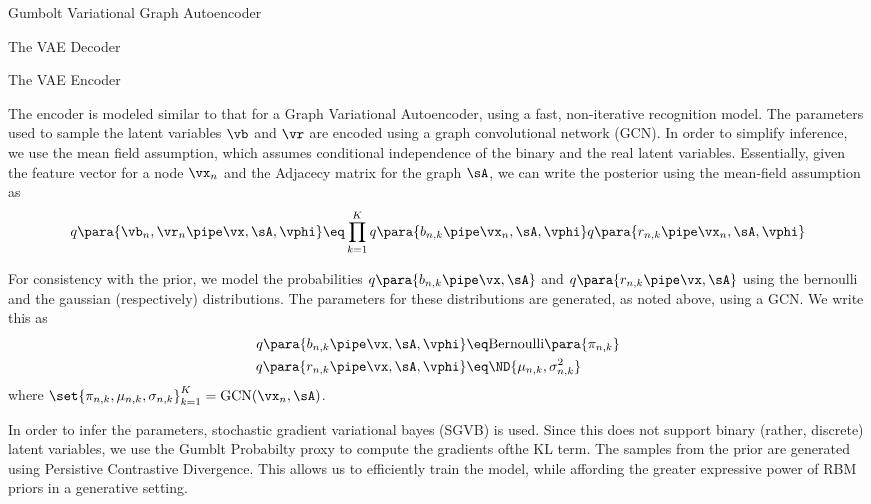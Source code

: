 \documentclass{article}
\newcommand{\qp}{q\para}
\begin{document}
\begin{psection}{Gumbolt Variational Graph Autoencoder}
\begin{psubsection}{The VAE Decoder}
	\end{psubsection}

	\begin{psubsection}{The VAE Encoder}

		The encoder is modeled similar to that for a Graph Variational Autoencoder, using a fast, non-iterative recognition model. The parameters used to sample the latent variables $\vb$ and $\vr$ are encoded using a graph convolutional network (GCN). In order to simplify inference, we use the mean field assumption, which assumes conditional independence of the binary and the real latent variables. Essentially, given the feature vector for a node $\vx_n$ and the Adjacecy matrix for the graph $\sA$, we can write the posterior using the mean-field assumption as
		\begin{align}
			\qp{\vb_n, \vr_n \pipe \vx, \sA, \vphi} \eq \prod_{k = 1}^K \qp{b_{n,k} \pipe \vx_n, \sA, \vphi} \qp{r_{n,k} \pipe \vx_n, \sA, \vphi}
			\label{eq:gvgcn-posterior-mean-field}
		\end{align}

		For consistency with the prior, we model the probabilities $\qp{b_{n, k} \pipe \vx, \sA}$ and $\qp{r_{n, k} \pipe \vx, \sA}$ using the bernoulli and the gaussian (respectively) distributions. The parameters for these distributions are generated, as noted above, using a GCN. We write this as
		\begin{align*}
			\qp{b_{n, k} \pipe \vx, \sA, \vphi} &\eq \text{Bernoulli}\para{\pi_{n, k}} \\
			\qp{r_{n, k} \pipe \vx, \sA, \vphi} &\eq \ND{\mu_{n, k}, \sigma_{n, k}^2}
		\end{align*}
		where $\set{\pi_{n, k}, \mu_{n, k}, \sigma_{n, k}}_{k = 1}^K= \text{GCN}(\vx_n, \sA)$.

		In order to infer the parameters, stochastic gradient variational bayes (SGVB) is used. Since this does not support binary (rather, discrete) latent variables, we use the Gumblt Probabilty proxy to compute the gradients ofthe KL term. The samples from the prior are generated using Persistive Contrastive Divergence. This allows us to efficiently train the model, while affording the greater expressive power of RBM priors in a generative setting.

	\end{psubsection}

\end{psection}
\end{document}
